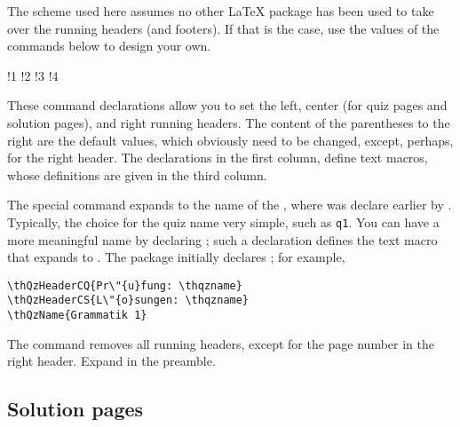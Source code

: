 \documentclass{article}
\def\FmtMP#1{\marginpar{\small\itshape\raggedleft#1}}
\edef\amtIndent{\the\parindent}
\begin{document}
 The scheme used here assumes no other {\LaTeX} package has been used to take over the running
 headers (and footers). If that is the case, use the values of the commands below to design
 your own.
\bVerb\small{}%
%
\edef\x{\the\eflength}%
\setlength{\eflength}{\bxSize}%
\def\1{\rlap{\hskip\eflength\rlap{\hskip\x\relax\quad\cs{def}\cs{th@QzHeaderLQ\darg{\ameta{text}}}}\sffamily(Thor's class)}}
\def\2{\rlap{\hskip\eflength\rlap{\hskip\x\relax\quad\cs{def}\cs{th@QzHeaderCQ\darg{\ameta{text}}}}\sffamily(Quiz \cs{thQuizName})}}
\def\3{\rlap{\hskip\eflength\rlap{\hskip\x\relax\quad\cs{def}\cs{th@QzHeaderCS\darg{\ameta{text}}}}\sffamily(Solutions: \cs{thQuizName})}}
\def\4{\rlap{\hskip\eflength\rlap{\hskip\x\relax\quad\cs{def}\cs{t@hQzHeaderR\darg{\ameta{text}}}}\sffamily(\cs{thepage})}}
\begin{dCmd}[fontsize=\small,commandchars=!()]{\bxSize}
!1
!2
!3
!4
\end{dCmd}
\eVerb These command declarations allow you to set the left, center (for quiz
pages and solution pages), and right running headers. The content of the
parentheses to the right are the default values, which obviously need to be
changed, except, perhaps, for the right header. The declarations in the first column,
define text macros, whose definitions are given in the third column.

The special command  expands to the name of the , where 
was declare earlier by . Typically, the choice
for the quiz name very simple, such as \texttt{q1}. You can have a more meaningful
name by declaring ; such a declaration
defines the text macro  that expands to . The package
initially declares ; for example,
\begin{Verbatim}[xleftmargin=\amtIndent]
\thQzHeaderCQ{Pr\"{u}fung: \thqzname}
\thQzHeaderCS{L\"{o}sungen: \thqzname}
\thQzName{Grammatik 1}
\end{Verbatim}
The \FmtMP{\cs{rhPgNumsOnly} discussed} command removes all
running headers, except for the page number in the right header. Expand in
the preamble.

\subsection{Solution pages}
\end{document}
